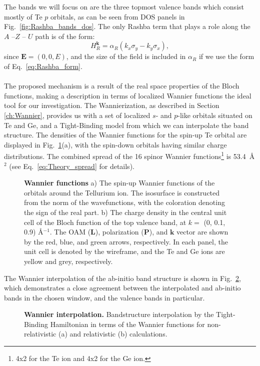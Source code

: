 The bands we will focus on are the three topmost valence bands which consist mostly of Te $p$ orbitals, as can be seen from DOS panels in Fig.~\ref{fig:Rashba_bands_dos}.
The only Rashba term that plays a role along the $A$ --$Z$ -- $U$ path is of the form:
\begin{equation}
	H_R^{\bm k} = \alpha_R (k_x \sigma_y - k_y \sigma_x),
\end{equation}
since $\bm E = (0, 0, E)$, and the size of the field is included in $\alpha_R$ if we use the form of Eq.~\eqref{eq:Rashba_form}.
\\\\
The proposed mechanism is a result of the real space properties of the Bloch functions, making a description in terms of localized Wannier functions the ideal tool for our investigation.
The Wannierization, as described in Section \ref{ch:Wannier}, provides us with a set of localized $s$- and $p$-like orbitals situated on Te and Ge, and a Tight-Binding model from which we can interpolate the band structure.
The densities of the Wannier functions for the spin-up Te orbital are displayed in Fig.~\ref{fig:Rashba_wannierfunctions}(a), with the spin-down orbitals having similar charge distributions.
The combined spread of the 16 spinor Wannier functions\footnote{4x2 for the Te ion and 4x2 for the Ge ion.} is 53.4~\AA$^2$ (see Eq.~\eqref{eq:Theory_spread} for details).
\begin{figure}
\caption{\label{fig:Rashba_wannierfunctions}{\bf Wannier functions} a) The spin-up Wannier functions of the orbitals around the Tellurium ion. The isosurface is constructed from the norm of the wavefunctions, with the coloration denoting the sign of the real part. b) The charge density in the central unit cell of the Bloch function of the top valence band, at $k=$ (0, 0.1, 0.9) \AA$^{-1}$. The OAM ($\bm L$), polarization ($\bm P$), and $\bm k$ vector are shown by the red, blue, and green arrows, respectively. In each panel, the unit cell is denoted by the wireframe, and the Te and Ge ions are yellow and grey, respectively.}
\end{figure}
The Wannier interpolation of the ab-initio band structure is shown in Fig.~\ref{fig:Rashba_wannierization}, which demonstrates a close agreement between the interpolated and ab-initio bands in the chosen window, and the valence bands in particular. 
\begin{figure}
\caption{\label{fig:Rashba_wannierization}{\bf Wannier interpolation.} Bandstructure interpolation by the Tight-Binding Hamiltonian in terms of the Wannier functions for non-relativistic (a) and relativistic (b) calculations.}
\end{figure}
